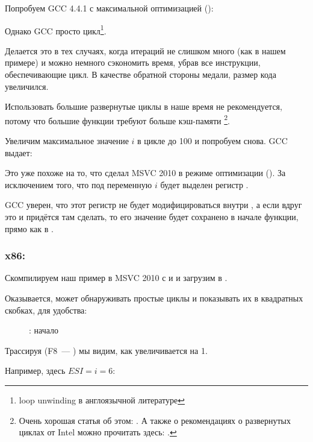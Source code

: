 Попробуем GCC 4.4.1 с максимальной оптимизацией (\Othree):



Однако GCC просто  цикл\footnote{\gls{loop unwinding} в англоязычной литературе}.

Делается это в тех случаях, когда итераций не слишком много (как в нашем примере)
и можно немного сэкономить время, убрав все инструкции, обеспечивающие цикл. 
В качестве обратной стороны медали, размер кода увеличился.

Использовать большие развернутые циклы в наше время не рекомендуется, потому что большие
функции требуют больше кэш-памяти%
\footnote{Очень хорошая статья об этом: \DrepperMemory.
А также о рекомендациях о развернутых циклах от Intel можно прочитать здесь: 
.}.

Увеличим максимальное значение $i$ в цикле до 100 и попробуем снова. GCC выдает:



Это уже похоже на то, что сделал MSVC 2010 в режиме оптимизации (\TT{\Ox}).
За исключением того, что под переменную $i$ будет выделен регистр \EBX.

GCC уверен, что этот регистр не будет 
модифицироваться внутри \ttf, а если вдруг это и придётся там сделать, то его значение будет сохранено 
в начале функции, прямо как в \main.

\clearpage
\subsubsection{x86: \olly}
\myindex{\olly}

Скомпилируем наш пример в MSVC 2010 с \Ox и \Obzero и загрузим в \olly.

Оказывается, \olly может обнаруживать простые циклы и показывать их в квадратных скобках, 
для удобства:

\begin{figure}[H]
\centering
{}
\caption{\olly: начало \main}
\label{fig:loops_olly_1}
\end{figure}

Трассируя (F8~--- \stepover) мы видим, как \ESI увеличивается на 1.

Например, здесь $ESI=i=6$:

